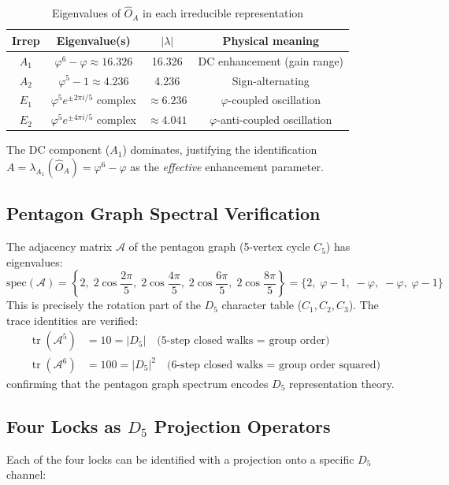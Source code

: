 \documentclass[12pt,a4paper,twocolumn]{article}
\renewcommand{\phi}{\varphi}
\begin{document}
\begin{table}[H]
\centering
\caption{Eigenvalues of $\hat{O}_A$ in each irreducible representation}
\label{tab:eigenvalues}
\begin{tabular}{c|c|c|c}
\hline
Irrep & Eigenvalue(s) & $|\lambda|$ & Physical meaning \\
\hline
$A_1$ & $\phi^6 - \phi \approx 16.326$ & 16.326 & DC enhancement (gain range) \\
$A_2$ & $\phi^5 - 1 \approx 4.236$ & 4.236 & Sign-alternating \\
$E_1$ & $\phi^5 e^{\pm 2\pi i/5}$ complex & $\approx 6.236$ & $\phi$-coupled oscillation \\
$E_2$ & $\phi^5 e^{\pm 4\pi i/5}$ complex & $\approx 4.041$ & $\phi$-anti-coupled oscillation \\
\hline
\end{tabular}
\end{table}

The DC component ($A_1$) dominates, justifying the identification $A = \lambda_{A_1}(\hat{O}_A) = \phi^6 - \phi$ as the \emph{effective} enhancement parameter.

\subsection{Pentagon Graph Spectral Verification}
The adjacency matrix $\mathcal{A}$ of the pentagon graph (5-vertex cycle $C_5$) has eigenvalues:
\[
\mathrm{spec}(\mathcal{A}) = \left\{2,\; 2\cos\frac{2\pi}{5},\; 2\cos\frac{4\pi}{5},\; 2\cos\frac{6\pi}{5},\; 2\cos\frac{8\pi}{5}\right\}
= \{2, \;\phi-1, \;-\phi, \;-\phi, \;\phi-1\}
\]
This is precisely the rotation part of the $D_5$ character table ($C_1, C_2, C_3$). The trace identities are verified:
\begin{align}
\operatorname{tr}(\mathcal{A}^5) &= 10 = |D_5| \quad \text{(5-step closed walks = group order)} \\
\operatorname{tr}(\mathcal{A}^6) &= 100 = |D_5|^2 \quad \text{(6-step closed walks = group order squared)}
\end{align}
confirming that the pentagon graph spectrum encodes $D_5$ representation theory.

\subsection{Four Locks as $D_5$ Projection Operators}
Each of the four locks can be identified with a projection onto a specific $D_5$ channel:
\end{document}
